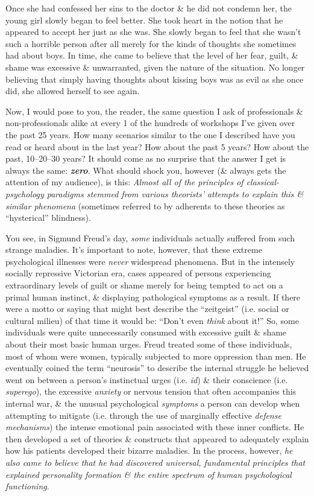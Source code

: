 \documentclass{article}
\numberwithin{equation}{section}
\begin{document}
Once she had confessed her sins to the doctor \& he did not condemn her, the young girl slowly began to feel better. She took heart in the notion that he appeared to accept her just as she was. She slowly began to feel that she wasn't such a horrible person after all merely for the kinds of thoughts she sometimes had about boys. In time, she came to believe that the level of her fear, guilt, \& shame was excessive \& unwarranted, given the nature of the situation. No longer believing that simply having thoughts about kissing boys was as evil as she once did, she allowed herself to see again.

Now, I would pose to you, the reader, the same question I ask of professionals \& non-professionals alike at every 1 of the hundreds of workshops I've given over the past 25 years. How many scenarios similar to the one I described have you read or heard about in the last year? How about the past 5 years? How about the past, 10--20--30 years? It should come as no surprise that the answer I get is always the same: \textbf{\textit{zero}}. What should shock you, however (\& always gets the attention of my audience), is this: \textit{Almost all of the principles of classical-psychology paradigms stemmed from various theorists' attempts to explain this \& similar phenomena} (sometimes referred to by adherents to these theories as ``hysterical'' blindness).

You see, in Sigmund Freud's day, \textit{some} individuals actually suffered from such strange maladies. It's important to note, however, that these extreme psychological illnesses were \textit{never} widespread phenomena. But in the intensely socially repressive Victorian era, cases appeared of persons experiencing extraordinary levels of guilt or shame merely for being tempted to act on a primal human instinct, \& displaying pathological symptoms as a result. If there were a motto or saying that might best describe the ``zeitgeist'' (i.e. social or cultural milieu) of that time it would be: ``Don't even \textit{think} about it!'' So, some individuals were quite unnecessarily consumed with excessive guilt \& shame about their most basic human urges. Freud treated some of these individuals, most of whom were women, typically subjected to more oppression than men. He eventually coined the term ``neurosis'' to describe the internal struggle he believed went on between a person's instinctual urges (i.e. \textit{id}) \& their conscience (i.e. \textit{superego}), the excessive \textit{anxiety} or nervous tension that often accompanies this internal war, \& the unusual psychological \textit{symptoms} a person can develop when attempting to mitigate (i.e. through the use of marginally effective \textit{defense mechanisms}) the intense emotional pain associated with these inner conflicts. He then developed a set of theories \& constructs that appeared to adequately explain how his patients developed their bizarre maladies. In the process, however, \textit{he also came to believe that he had discovered universal, fundamental principles that explained personality formation \& the entire spectrum of human psychological functioning}.
\end{document}
